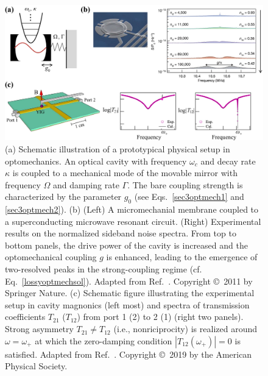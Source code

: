 \documentclass{tADP2e}
\theoremstyle{plain}
\theoremstyle{plain}
\theoremstyle{definition}
\begin{document}
\begin{figure}
\begin{center}
\includegraphics[width=13cm]{./Figures/fig_3_optmech.pdf}
\end{center}
\caption{(a) Schematic illustration of a prototypical physical setup in optomechanics. An optical cavity with frequency $\omega_{c}$ and decay rate $\kappa$ is coupled to a mechanical mode of the movable mirror with frequency $\Omega$ and damping rate $\Gamma$. The bare coupling strength is characterized by the parameter $g_0$ (see Eqs.~\eqref{sec3optmech1} and \eqref{sec3optmech2}). (b) (Left) A micromechanial membrane coupled to a superconducting microwave resonant circuit. (Right) Experimental results on the normalized sideband noise spectra. From top to bottom panels, the drive power of the cavity is increased and the optomechanical coupling $g$ is enhanced, leading to the emergence of two-resolved peaks in the strong-coupling regime (cf. Eq.~\eqref{lossyoptmechsol}).  Adapted from Ref.~\cite{TJD112}. Copyright \copyright\,   2011 by Springer Nature. (c) Schematic figure illustrating the experimental setup in cavity magnonics (left most) and spectra of transmission coefficients $T_{21}$ ($T_{12}$) from port 1 (2) to 2 (1) (right two panels). Strong asymmetry $T_{21}\neq T_{12}$ (i.e., nonriciprocity) is realized around $\omega=\omega_{+}$ at which the zero-damping condition $|T_{12}(\omega_{+})|=0$ is satisfied.  Adapted from Ref.~\cite{WYP19}. Copyright \copyright\,   2019 by the American Physical Society.  }
\label{fig:3optmech}
\end{figure}
\end{document}
